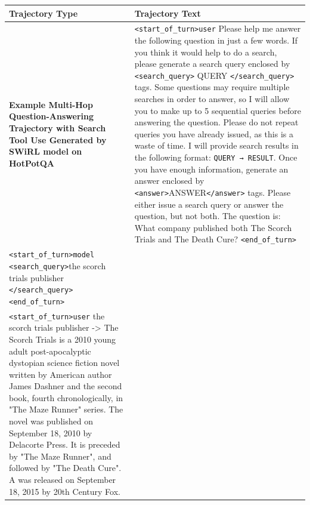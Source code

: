 \documentclass{article} %
\begin{document}
\begin{table}[h!]
    \centering
    \small %
    \begin{tabular}{|p{5cm}|p{8cm}|} %
        \hline
        \textbf{Trajectory Type} & \textbf{Trajectory Text} \\
        \hline
        \textbf{Example Multi-Hop Question-Answering Trajectory with Search Tool Use Generated by SWiRL model on HotPotQA} & 
        \raggedright 
        \texttt{\textless start\_of\_turn\textgreater user} \newline
        Please help me answer the following question in just a few words. If you think it would help to do a search, please generate a search query enclosed by \texttt{\textless search\_query\textgreater} QUERY \texttt{\textless /search\_query\textgreater} tags. \newline
        Some questions may require multiple searches in order to answer, so I will allow you to make up to 5 sequential queries before answering the question. \newline
        Please do not repeat queries you have already issued, as this is a waste of time. \newline
        I will provide search results in the following format: \newline
        \texttt{QUERY → RESULT}. \newline
        Once you have enough information, generate an answer enclosed by \texttt{\textless answer\textgreater}ANSWER\texttt{\textless /answer\textgreater} tags. \newline
        Please either issue a search query or answer the question, but not both. \newline
        The question is: What company published both The Scorch Trials and The Death Cure? \newline
        \texttt{\textless end\_of\_turn\textgreater} \\
        \texttt{\textless start\_of\_turn\textgreater model} \newline
        \texttt{\textless search\_query\textgreater}the scorch trials publisher \texttt{\textless /search\_query\textgreater} \newline
        \texttt{\textless end\_of\_turn\textgreater} \\
        \texttt{\textless start\_of\_turn\textgreater user} \newline
        the scorch trials publisher -> The Scorch Trials is a 2010 young adult post-apocalyptic dystopian science fiction novel written by American author James Dashner and the second book, fourth chronologically, in "The Maze Runner" series. The novel was published on September 18, 2010 by Delacorte Press. It is preceded by "The Maze Runner", and followed by "The Death Cure". A was released on September 18, 2015 by 20th Century Fox. \newline

\end{tabular}
\end{table}
\end{document}
